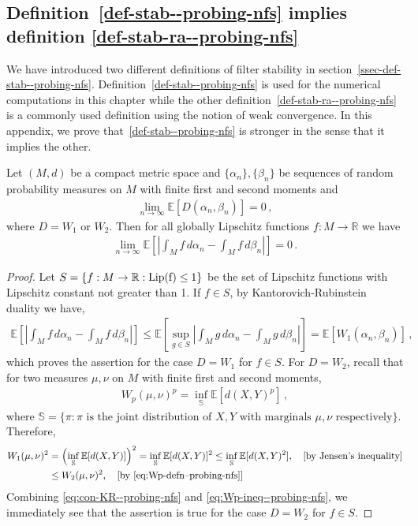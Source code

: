 {\color{mypink}
\subsection{Definition~\ref{def-stab--probing-nfs} implies definition \ref{def-stab-ra--probing-nfs}}

We have introduced two different definitions of filter stability in section~\ref{ssec-def-stab--probing-nfs}. Definition~\ref{def-stab--probing-nfs} is used for the numerical computations in this chapter while the other definition~\ref{def-stab-ra--probing-nfs} is a commonly used definition using the notion of weak convergence. In this appendix, we prove that~\ref{def-stab--probing-nfs} is stronger in the sense that it implies the other.
}
\begin{thm} Let $(M, d)$ be a compact metric space and $\{\alpha_n\}, \{\beta_n\}$ be sequences of random probability measures on $M$ with finite first and second moments and 
\begin{align}
    \lim_{n\to\infty}\mathbb E[D(\alpha_n, \beta_n)] = 0 \,,
\end{align}
where $D = W_1$ or $W_2$. Then for all globally Lipschitz functions $f: M \to \mathbb R$ we have
\begin{align}
    \lim_{n\to\infty}\mathbb E\left[\left|\int_M f\,d\alpha_n -\int_M f\,d\beta_n\right|\right] = 0 \,.
\label{eq-fconv--probing-nfs} \end{align}

\begin{proof}
Let $S=\{f:M\to\mathbb R:\rm{Lip}(f)\le 1\}$ be the set of Lipschitz functions with Lipschitz constant not greater than 1.
If $f\in S$, by Kantorovich-Rubinstein duality we have,
\begin{align}
    \mathbb E\left[\left|\int_M f\,d\alpha_n -\int_M f\,d\beta_n\right|\right] \le 
    \mathbb E\left[\sup_{g\in S}\left|\int_M g\,d\alpha_n -\int_M g\,d\beta_n\right|\right]=\mathbb E[W_1(\alpha_n, \beta_n)] \,,\label{eq:con-KR--probing-nfs}
\end{align}
which proves the assertion for the case $D=W_1$ for $f \in S$. For $D=W_2$, recall that for two measures $\mu, \nu$ on $M$ with finite first and second moments, 
\begin{align}
    W_p(\mu, \nu)^p = \inf_{\mathbb S}\mathbb E[d(X, Y)^p] \,, \label{eq:Wp-defn--probing-nfs}
\end{align}
where $\mathbb S = \{\pi: \pi \text{ is the joint distribution of } X, Y \text{ with marginals  } \mu, \nu \text{ respectively}\}$. Therefore,
\begin{align}
    W_1(\mu, \nu)^2 &= \left(\inf_{\mathbb S}\mathbb E[d(X, Y)]\right)^2=\inf_{\mathbb S}\mathbb E[d(X, Y)]^2 \le \inf_{\mathbb S}\mathbb E[d(X, Y)^2], \quad\text{[by Jensen's inequality]}\\
    &\le W_2(\mu, \nu)^2,\quad\text{[by } \eqref{eq:Wp-defn--probing-nfs}] \label{eq:Wp-ineq--probing-nfs}
\end{align}
Combining \eqref{eq:con-KR--probing-nfs} and \eqref{eq:Wp-ineq--probing-nfs}, we immediately see that the assertion is true for the case $D = W_2$ for $f \in S$.


\end{proof}
\end{thm}
